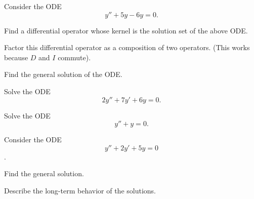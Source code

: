 
\begin{applicationActivities}

\begin{activity}{10}
Consider the ODE \[y''+5y-6y=0.\]
\begin{subactivity}
Find a differential operator whose kernel is the solution set of the above ODE.
\end{subactivity}
\begin{subactivity}
Factor this differential operator as a composition of two operators. (This works because \(D\) and \(I\) commute).
\end{subactivity}
\begin{subactivity}
Find the general solution of the ODE.
\end{subactivity}
\end{activity}

\begin{activity}{10}
Solve the ODE \[ 2y''+7y'+6y=0.\]
\end{activity}

\begin{activity}{15}
Solve the ODE \[ y''+y=0.\]
\end{activity}

\begin{activity}{15}
Consider the ODE \[y''+2y'+5y=0\].
\begin{subactivity}
Find the general solution.
\end{subactivity}
\begin{subactivity}
Describe the long-term behavior of the solutions.
\end{subactivity}
\end{activity}


\end{applicationActivities}
